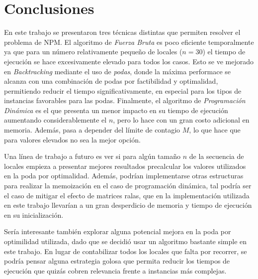 \section{Conclusiones}

En este trabajo se presentaron tres técnicas distintas que permiten resolver el problema de NPM. El algoritmo de \textit{Fuerza Bruta} es poco eficiente temporalmente ya que para un número relativamente pequeño de locales ($n=30$) el tiempo de ejecución se hace excesivamente elevado para todos los casos. Esto se ve mejorado en \textit{Backtracking} mediante el uso de \textit{podas}, donde la máxima performace se alcanza con una combinación de podas por factibilidad y optimalidad, permitiendo reducir el tiempo significativamente, en especial para los tipos de instancias favorables para las podas. Finalmente, el algoritmo de \textit{Programación Dinámica} es el que presenta un menor impacto en su tiempo de ejecución aumentando considerablemente el $n$, pero lo hace con un gran costo adicional en memoria. Además, pasa a depender del límite de contagio $M$, lo que hace que para valores elevados no sea la mejor opción.

Una línea de trabajo a futuro es ver si para algún tamaño $n$ de la secuencia de locales empieza a presentar mejores resultados precalcular los valores utilizados en la poda por optimalidad. Además, podrían implementarse otras estructuras para realizar la memoización en el caso de programación dinámica, tal podría ser el caso de mitigar el efecto de matrices ralas, que en la implementación utilizada en este trabajo llevarían a un gran desperdicio de memoria y tiempo de ejecución en su inicialización. 

Sería interesante también explorar alguna potencial mejora en la poda por optimilidad utilizada, dado que se decidió usar un algoritmo bastante simple en este trabajo. En lugar de contabilizar todos los locales que falta por recorrer, se podría pensar alguna estrategia golosa que permita reducir los tiempos de ejecución que quizás cobren relevancia frente a instancias más complejas.